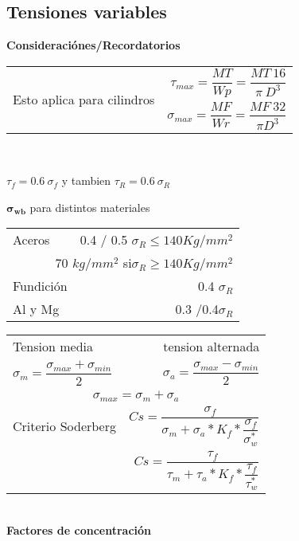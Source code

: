 \documentclass[11pt,a4paper]{article}
\begin{document}
\begin{multicols}{2}
\begin{cajita}
	\end{cajita}


	\begin{cajita}
		\section*{Tensiones variables}
		\begin{cajita}
			\textbf{Consideraciónes/Recordatorios}\\\vspace{0.2cm}
			\begin{tabular}{l|r}
			\multirow[r]{2}{2.5 cm}{Esto aplica para cilindros}& $\tau_{max}=\dfrac{MT}{Wp}=\dfrac{MT~16}{\pi~D^{3}}$\\[0.3 cm]
				& $\sigma_{max}=\dfrac{MF}{Wr}=\dfrac{MF~32}{\pi D^{3}}$\\[0.2 cm]
			\end{tabular}\\\vspace{0.2cm}
		
		$\tau_{f}=0.6~\sigma_{f}$ y tambien $\tau_{R}=0.6~\sigma_{R}$ \\\vspace{0.3cm}
		
		$\mathbf{\sigma_{wb}}$ para distintos materiales\\\vspace*{0.2cm}
			\begin{tabular}{l|r}
				Aceros	& 0.4 / 0.5 $\sigma_{R}\leq140Kg/mm^{2}$\\
				\multicolumn{2}{r}{ 70 $kg/mm^{2}$ si$\sigma_{R}\geq140Kg/mm^{2}$}\\
				Fundición & 0.4 $\sigma_{R}$\\
				Al y Mg & 0.3 /0.4$\sigma_{R}$\\
				
			\end{tabular}
		
			
		
		\end{cajita}
		\begin{tabular}{l r}
			Tension media & tension alternada\\
			$\sigma_{m}=\dfrac{\sigma_{max}+\sigma_{min}}{2}$&$\sigma_{a}=\dfrac{\sigma_{max}-\sigma_{min}}{2}$\\[0.3cm]
			\multicolumn{2}{c}{$\sigma_{max}=\sigma_{m}+\sigma_{a}$}\\[0.3cm]
			Criterio Soderberg & $Cs=\dfrac{\sigma_{f}}{\sigma_{m}+\sigma_{a}*K_{f}*\dfrac{\sigma_{f}}{\sigma_{w}^{*}}}$\\[0.3cm]
			& $Cs=\dfrac{\tau_{f}}{\tau_{m}+\tau_{a}*K_{f}*\dfrac{\tau_{f}}{\tau_{w}^{*}}}$\\
		\end{tabular}\\
	\textbf{Factores de concentración}
	

\end{cajita}
\end{multicols}
\end{document}

